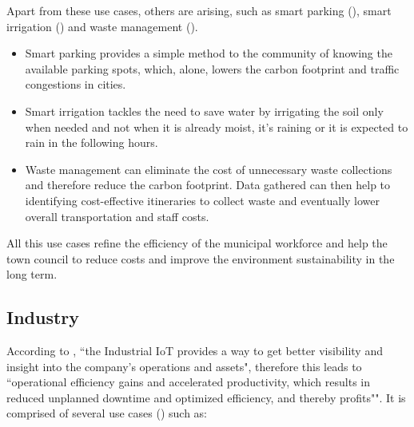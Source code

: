 Apart from these use cases, others are arising, such as smart parking (\cite{GOAP201841}), smart irrigation (\cite{7562735}) and waste management (\cite{7972276}).
\begin{itemize}
    \item Smart parking provides a simple method to the community of knowing the available parking spots, which, alone, lowers the carbon footprint and traffic congestions in cities.

    \item Smart irrigation tackles the need to save water by irrigating the soil only when needed and not when it is already moist, it's raining or it is expected to rain in the following hours.

    \item Waste management can eliminate the cost of unnecessary waste collections and therefore reduce the carbon footprint. Data gathered can then help to identifying cost-effective itineraries to collect waste and eventually lower overall transportation and staff costs.
\end{itemize}

All this use cases refine the efficiency of the municipal workforce and help the town council to reduce costs and improve the environment sustainability in the long term.

\subsection{Industry}
\label{subsec:stateofart:areas:industry}

According to \cite{iiot}, ``the Industrial \gls{IoT} provides a way to get better visibility and insight into the company's operations and assets", therefore this leads to ``operational efficiency gains and accelerated productivity, which results in reduced unplanned downtime and optimized efficiency, and thereby profits"".
It is comprised of several use cases (\cite{iiot-cases}) such as:

